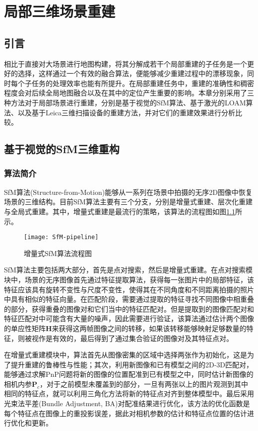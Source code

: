 
\chapter{局部三维场景重建}
\label{ch2}
\section{引言}
相比于直接对大场景进行地图构建，将其分解成若干个局部重建的子任务是一个更好的选择，这样通过一个有效的融合算法，便能够减少重建过程中的漂移现象，同时每个子任务的处理效率也能有所提升。在局部重建任务中，重建的准确性和稠密程度会对后续全局地图融合以及在其中的定位产生重要的影响。本章分别采用了三种方法对于局部场景进行重建，分别是基于视觉的SfM算法、基于激光的LOAM算法、以及基于Leica三维扫描设备的重建方法，并对它们的重建效果进行分析比较。

\section{基于视觉的SfM三维重构}
\subsection{算法简介}
SfM算法(Structure-from-Motion)能够从一系列在场景中拍摄的无序2D图像中恢复场景的三维结构。目前SfM算法主要有三个分支，分别是增量式重建\cite{agarwal2011building}、层次化重建\cite{gherardi2010improving}与全局式重建\cite{crandall2011discrete}。其中，增量式重建是最流行的策略，该算法的流程图如图\ref{SfM-pipeline}所示\cite{schonberger2016structure}。
\begin{figure}
	\centering
	\texttt{[image: SfM-pipeline]}
	\caption{增量式SfM算法流程图}
	\label{SfM-pipeline}
\end{figure}

SfM算法主要包括两大部分，首先是点对搜索，然后是增量式重建。在点对搜索模块中，场景的无序图像首先通过特征提取算法，获得每一张图片中的局部特征，该特征应该具有旋转不变性与尺度不变性，使得其在不同角度和不同距离拍摄的照片中具有相似的特征向量。在匹配阶段，需要通过提取的特征寻找不同图像中相重叠的部分，获得重叠的图像对和它们当中的特征匹配对。但是提取到的图像匹配对和特征匹配对中可能含有大量的噪声，因此需要进行验证，该算法通过估计两个图像的单应性矩阵$\boldsymbol{H}$来获得这两帧图像之间的转移，如果该转移能够映射足够数量的特征，则被视作是有效的，最后得到了通过集合验证的图像对及其特征点对。

在增量式重建模块中，算法首先从图像密集的区域中选择两张作为初始化，这是为了提升重建的鲁棒性与性能；其次，利用新图像和已有模型之间的2D-3D匹配对，能够通过求解PnP问题\cite{li2012robust}将新的图像的位置配准到已有模型之中，同时估计新图像的相机内参$\boldsymbol{P}_c$，对于之前模型未覆盖到的部分，一旦有两张以上的图片观测到其中相同的特征点，就可以利用三角化方法将新的特征点对齐到整体模型中。最后采用光束法平差(Bundle Adjustment, BA)\cite{triggs1999bundle}对配准结果进行优化，该方法的优化函数是每个特征点在图像上的重投影误差，据此对相机参数的估计和特征点位置的估计进行优化和更新。

